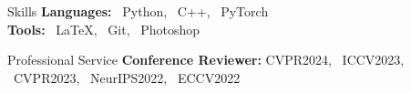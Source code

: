 \documentclass{template_2311} %
\begin{document}
\begin{rSection}{Skills}
    {\bf Languages:}  ~Python, ~C++, ~PyTorch \\
    {\bf Tools:} ~\LaTeX, ~Git, ~Photoshop
\end{rSection}


\begin{rSection}{Professional Service} 
    {\bf Conference Reviewer:} {CVPR2024, ~ICCV2023, ~CVPR2023, ~NeurIPS2022, ~ECCV2022}
\end{rSection}
\end{document}
